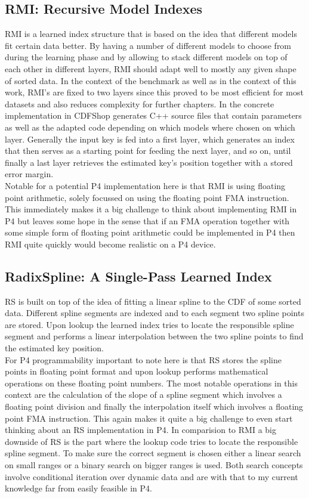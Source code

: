 \subsection{RMI: Recursive Model Indexes}
\label{sect:background:rmi}
RMI \cite{rmi} is a learned index structure that is based on the idea that different models fit certain data better. By having a number of different models to choose from during the learning phase and by allowing to stack different models on top of each other in different layers, RMI should adapt well to mostly any given shape of sorted data. In the context of the benchmark as well as in the context of this work, RMI's are fixed to two layers since this proved to be most efficient for most datasets and also reduces complexity for further chapters. In the concrete implementation in \cite{cdfshop} CDFShop generates C++ source files that contain parameters as well as the adapted code depending on which models where chosen on which layer. Generally the input key is fed into a first layer, which generates an index that then serves as a starting point for feeding the next layer, and so on, until finally a last layer retrieves the estimated key's position together with a stored error margin.\\
Notable for a potential P4 implementation here is that RMI is using floating point arithmetic, solely focussed on using the floating point FMA instruction. This immediately makes it a big challenge to think about implementing RMI in P4 but leaves some hope in the sense that if an FMA operation together with some simple form of floating point arithmetic could be implemented in P4 then RMI quite quickly would become realistic on a P4 device.

\subsection{RadixSpline: A Single-Pass Learned Index}
RS \cite{radixspline} is built on top of the idea of fitting a linear spline to the CDF of some sorted data. Different spline segments are indexed and to each segment two spline points are stored. Upon lookup the learned index tries to locate the responsible spline segment and performs a linear interpolation between the two spline points to find the estimated key position.\\
For P4 programmability important to note here is that RS stores the spline points in floating point format and upon lookup performs mathematical operations on these floating point numbers. The most notable operations in this context are the calculation of the slope of a spline segment which involves a floating point division and finally the interpolation itself which involves a floating point FMA instruction. This again makes it quite a big challenge to even start thinking about an RS implementation in P4. In comparision to RMI a big downside of RS is the part where the lookup code tries to locate the responsible spline segment. To make sure the correct segment is chosen either a linear search on small ranges or a binary search on bigger ranges is used. Both search concepts involve conditional iteration over dynamic data and are with that to my current knowledge far from easily feasible in P4.

